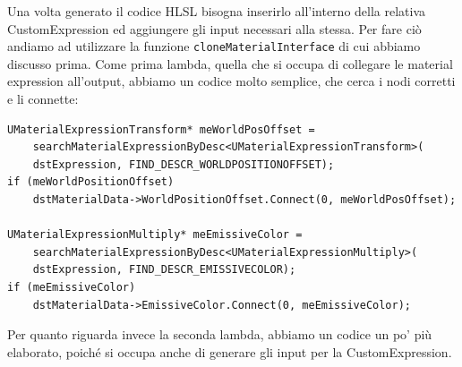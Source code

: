 \documentclass[main.tex]{subfiles}
\begin{document}
Una volta generato il codice HLSL bisogna inserirlo all'interno della relativa CustomExpression ed aggiungere gli input necessari alla stessa. Per fare ciò andiamo ad utilizzare la funzione \lstinline{cloneMaterialInterface} di cui abbiamo discusso prima. Come prima lambda, quella che si occupa di collegare le material expression all'output, abbiamo un codice molto semplice, che cerca i nodi corretti e li connette:
\begin{lstlisting}
UMaterialExpressionTransform* meWorldPosOffset =
    searchMaterialExpressionByDesc<UMaterialExpressionTransform>(
    dstExpression, FIND_DESCR_WORLDPOSITIONOFFSET);
if (meWorldPositionOffset)
    dstMaterialData->WorldPositionOffset.Connect(0, meWorldPosOffset);

UMaterialExpressionMultiply* meEmissiveColor =
    searchMaterialExpressionByDesc<UMaterialExpressionMultiply>(
    dstExpression, FIND_DESCR_EMISSIVECOLOR);
if (meEmissiveColor)
    dstMaterialData->EmissiveColor.Connect(0, meEmissiveColor);
\end{lstlisting}

Per quanto riguarda invece la seconda lambda, abbiamo un codice un po' più elaborato, poiché si occupa anche di generare gli input per la CustomExpression. \newline
\end{document}
